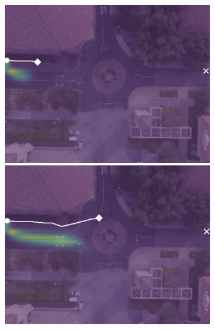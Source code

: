 \documentclass[usenames,dvipsnames]{article}
\begin{document}
\begin{enumerate}
\begin{item}
\begin{figure}[t!]
\begin{subfigure}[t]{0.5\textwidth}
	\vspace{0.1cm}
	\begin{minipage}[c]{0.45cm}
	\end{minipage}
	\begin{minipage}[c]{0.3\linewidth}
		\includegraphics[width=\linewidth]{./figures/comparison/kit_death_1_2_t=70.jpg}
	\end{minipage}
	\begin{minipage}[c]{0.3\linewidth}
		\includegraphics[width=\linewidth]{./figures/comparison/kit_death_1_2_t=250.jpg}
	\end{minipage}
	\begin{minipage}[c]{0.3\linewidth}

\end{minipage}
\end{subfigure}
\end{figure}
\end{item}
\end{enumerate}
\end{document}

